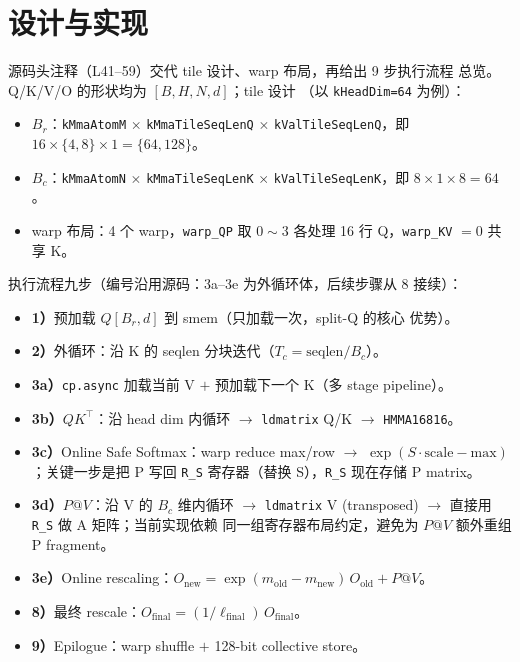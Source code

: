 \section{设计与实现}

源码头注释（L41--59）交代 tile 设计、warp 布局，再给出 9 步执行流程
总览。Q/K/V/O 的形状均为 $[B, H, N, d]$；tile 设计
（以 \texttt{kHeadDim=64} 为例）：
\begin{itemize}
  \item $B_r$：\texttt{kMmaAtomM} $\times$ \texttt{kMmaTileSeqLenQ} $\times$
        \texttt{kValTileSeqLenQ}，即 $16 \times \{4, 8\} \times 1 = \{64, 128\}$。
  \item $B_c$：\texttt{kMmaAtomN} $\times$ \texttt{kMmaTileSeqLenK} $\times$
        \texttt{kValTileSeqLenK}，即 $8 \times 1 \times 8 = 64$。
  \item warp 布局：4 个 warp，\texttt{warp\_QP} 取 $0 \sim 3$ 各处理 16 行
        Q，\texttt{warp\_KV} $= 0$ 共享 K。
\end{itemize}

执行流程九步（编号沿用源码：3a--3e 为外循环体，后续步骤从 8 接续）：
\begin{itemize}
  \item \textbf{1）}预加载 $Q[B_r, d]$ 到 smem（只加载一次，split-Q 的核心
        优势）。
  \item \textbf{2）}外循环：沿 K 的 seqlen 分块迭代（$T_c =
        \mathrm{seqlen}/B_c$）。
  \item \textbf{3a）}\texttt{cp.async} 加载当前 V $+$ 预加载下一个 K（多
        stage pipeline）。
  \item \textbf{3b）}$QK^{\top}$：沿 head dim 内循环 $\to$ \texttt{ldmatrix}
        Q/K $\to$ \texttt{HMMA16816}。
  \item \textbf{3c）}Online Safe Softmax：warp reduce max/row $\to$
        $\exp(S \cdot \mathrm{scale} - \mathrm{max})$；关键一步是把 P 写回
        \texttt{R\_S} 寄存器（替换 S），\texttt{R\_S} 现在存储 P matrix。
  \item \textbf{3d）}$P@V$：沿 V 的 $B_c$ 维内循环 $\to$ \texttt{ldmatrix}
        V (transposed) $\to$ 直接用 \texttt{R\_S} 做 A 矩阵；当前实现依赖
        同一组寄存器布局约定，避免为 $P@V$ 额外重组 P fragment。
  \item \textbf{3e）}Online rescaling：$O_{\text{new}} =
        \exp(m_{\text{old}} - m_{\text{new}})\,O_{\text{old}} + P@V$。
  \item \textbf{8）}最终 rescale：$O_{\text{final}} =
        (1/\ell_{\text{final}})\,O_{\text{final}}$。
  \item \textbf{9）}Epilogue：warp shuffle $+$ 128-bit collective store。
\end{itemize}

